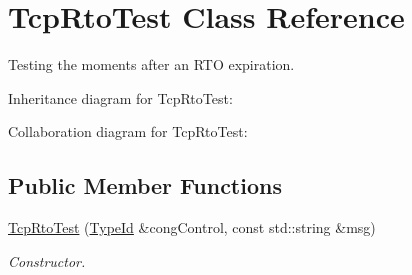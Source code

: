 \hypertarget{classTcpRtoTest}{}\section{Tcp\+Rto\+Test Class Reference}
\label{classTcpRtoTest}


Testing the moments after an R\+TO expiration.  




Inheritance diagram for Tcp\+Rto\+Test\+:


Collaboration diagram for Tcp\+Rto\+Test\+:
\subsection*{Public Member Functions}
\begin{DoxyCompactItemize}
\item 
\hyperlink{classTcpRtoTest_a883308e5e69a8ffa4cf49430afca1467}{Tcp\+Rto\+Test} (\hyperlink{classns3_1_1TypeId}{Type\+Id} \&cong\+Control, const std\+::string \&msg)
\begin{DoxyCompactList}\small\item\em Constructor. \end{DoxyCompactList}\end{DoxyCompactItemize}
